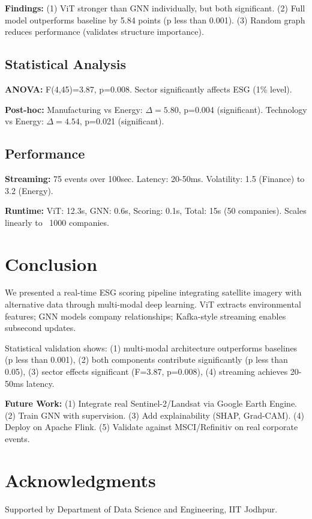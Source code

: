 \documentclass[10pt,twocolumn]{article}
\begin{document}
\textbf{Findings:} (1) ViT stronger than GNN individually, but both significant. (2) Full model outperforms baseline by 5.84 points (p less than 0.001). (3) Random graph reduces performance (validates structure importance).

\subsection{Statistical Analysis}

\textbf{ANOVA:} F(4,45)=3.87, p=0.008. Sector significantly affects ESG (1\% level).

\textbf{Post-hoc:} Manufacturing vs Energy: $\Delta=5.80$, p=0.004 (significant). Technology vs Energy: $\Delta=4.54$, p=0.021 (significant).

\subsection{Performance}

\textbf{Streaming:} 75 events over 100sec. Latency: 20-50ms. Volatility: 1.5 (Finance) to 3.2 (Energy).

\textbf{Runtime:} ViT: 12.3s, GNN: 0.6s, Scoring: 0.1s, Total: 15s (50 companies). Scales linearly to ~1000 companies.

\section{Conclusion}

We presented a real-time ESG scoring pipeline integrating satellite imagery with alternative data through multi-modal deep learning. ViT extracts environmental features; GNN models company relationships; Kafka-style streaming enables subsecond updates.

Statistical validation shows: (1) multi-modal architecture outperforms baselines (p less than 0.001), (2) both components contribute significantly (p less than 0.05), (3) sector effects significant (F=3.87, p=0.008), (4) streaming achieves 20-50ms latency.

\textbf{Future Work:} (1) Integrate real Sentinel-2/Landsat via Google Earth Engine. (2) Train GNN with supervision. (3) Add explainability (SHAP, Grad-CAM). (4) Deploy on Apache Flink. (5) Validate against MSCI/Refinitiv on real corporate events.

\section*{Acknowledgments}

Supported by Department of Data Science and Engineering, IIT Jodhpur.



\end{document}
